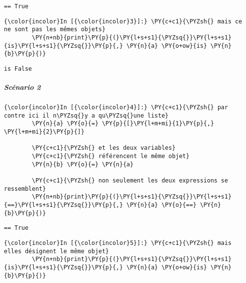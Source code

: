     \begin{Verbatim}[commandchars=\\\{\},frame=single,framerule=0.3mm,rulecolor=\color{cellframecolor}]
== True
\end{Verbatim}

    \begin{Verbatim}[commandchars=\\\{\},frame=single,framerule=0.3mm,rulecolor=\color{cellframecolor}]
{\color{incolor}In [{\color{incolor}3}]:} \PY{c+c1}{\PYZsh{} mais ce ne sont pas les mêmes objets}
        \PY{n+nb}{print}\PY{p}{(}\PY{l+s+s1}{\PYZsq{}}\PY{l+s+s1}{is}\PY{l+s+s1}{\PYZsq{}}\PY{p}{,} \PY{n}{a} \PY{o+ow}{is} \PY{n}{b}\PY{p}{)}
\end{Verbatim}


    \begin{Verbatim}[commandchars=\\\{\},frame=single,framerule=0.3mm,rulecolor=\color{cellframecolor}]
is False
\end{Verbatim}

    \hypertarget{scuxe9nario-2}{%
\subparagraph{Scénario 2}\label{scuxe9nario-2}}

    \begin{Verbatim}[commandchars=\\\{\},frame=single,framerule=0.3mm,rulecolor=\color{cellframecolor}]
{\color{incolor}In [{\color{incolor}4}]:} \PY{c+c1}{\PYZsh{} par contre ici il n\PYZsq{}y a qu\PYZsq{}une liste}
        \PY{n}{a} \PY{o}{=} \PY{p}{[}\PY{l+m+mi}{1}\PY{p}{,} \PY{l+m+mi}{2}\PY{p}{]}
        
        \PY{c+c1}{\PYZsh{} et les deux variables}
        \PY{c+c1}{\PYZsh{} référencent le même objet}
        \PY{n}{b} \PY{o}{=} \PY{n}{a}
        
        \PY{c+c1}{\PYZsh{} non seulement les deux expressions se ressemblent}
        \PY{n+nb}{print}\PY{p}{(}\PY{l+s+s1}{\PYZsq{}}\PY{l+s+s1}{==}\PY{l+s+s1}{\PYZsq{}}\PY{p}{,} \PY{n}{a} \PY{o}{==} \PY{n}{b}\PY{p}{)}
\end{Verbatim}


    \begin{Verbatim}[commandchars=\\\{\},frame=single,framerule=0.3mm,rulecolor=\color{cellframecolor}]
== True
\end{Verbatim}

    \begin{Verbatim}[commandchars=\\\{\},frame=single,framerule=0.3mm,rulecolor=\color{cellframecolor}]
{\color{incolor}In [{\color{incolor}5}]:} \PY{c+c1}{\PYZsh{} mais elles désignent le même objet}
        \PY{n+nb}{print}\PY{p}{(}\PY{l+s+s1}{\PYZsq{}}\PY{l+s+s1}{is}\PY{l+s+s1}{\PYZsq{}}\PY{p}{,} \PY{n}{a} \PY{o+ow}{is} \PY{n}{b}\PY{p}{)}
\end{Verbatim}


